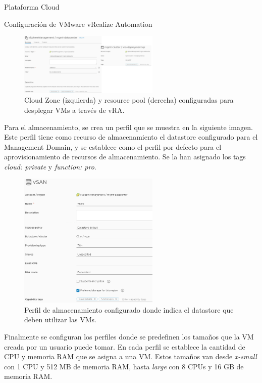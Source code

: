 \begin{subsection}{Plataforma Cloud}
\begin{subsubsection}{Configuración de VMware vRealize Automation}
       \begin{figure}[h]
            \centering
            \includegraphics[width=0.6\textwidth]{imaxes/pruebaconcepto/vrealize/cloud-zone.png}
            \caption{Cloud Zone (izquierda) y resource pool (derecha) configuradas para desplegar VMs a través de vRA.}
            \label{fig:cloud-zone}
        \end{figure}
        \FloatBarrier
        Para el almacenamiento, se crea un perfil que se muestra en la siguiente imagen. Este perfil tiene como recurso de almacenamiento el datastore configurado para el Management Domain, y se establece como el perfil por defecto para el aprovisionamiento de recursos de almacenamiento. Se la han asignado los tags \textit{cloud: private} y \textit{function: pro}. 
        \begin{figure}[h]
            \centering
            \includegraphics[width=0.6\textwidth]{imaxes/pruebaconcepto/vrealize/datastore-policy.png}
            \caption{Perfil de almacenamiento configurado donde indica el datastore que deben utilizar las VMs.}
            \label{fig:storage-policy}
        \end{figure}
        \FloatBarrier
        Finalmente se configuran los perfiles donde se predefinen los tamaños que la VM creada por un usuario puede tomar. En cada perfil se establece la cantidad de CPU y memoria RAM que se asigna a una VM. Estos tamaños van desde \textit{x-small} con 1 CPU y 512 MB de memoria RAM, hasta \textit{large} con 8 CPUs y 16 GB de memoria RAM.

\end{subsubsection}
\end{subsection}
